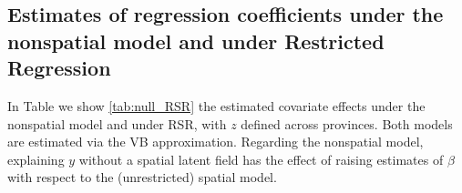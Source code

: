 \documentclass[openany, 11pt, oneside]{book}
\begin{document}
\begin{subappendices}
\subsection{Estimates of regression coefficients under the nonspatial model and under Restricted Regression} \label{Appendix:null_RSR}

In Table we show \ref{tab:null_RSR} the estimated covariate effects under the nonspatial model and under RSR, with $z$ defined across provinces. Both models are estimated via the VB approximation. Regarding the nonspatial model, explaining $y$ without a spatial latent field has the effect of raising estimates of $\beta$ with respect to the (unrestricted) spatial model. 


\begin{table}[ht]
  \captionsetup{width=0.9\textwidth}
\caption{Posterior summaries of covariate effects under the nonspatial model and the RSR-ICAR model defined at the province level}
\label{tab:null_RSR}
\end{table}


\end{subappendices}
\end{document}
